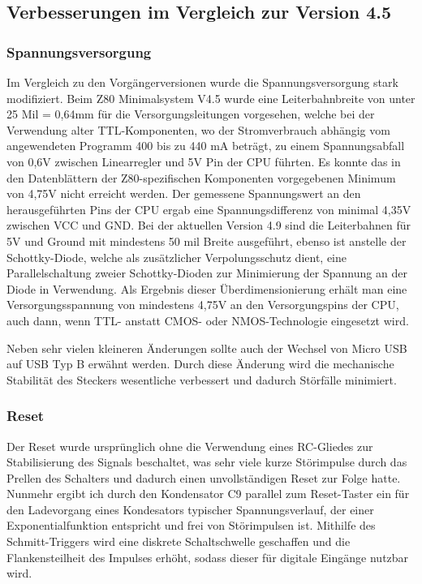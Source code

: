 \subsection{Verbesserungen im Vergleich zur Version 4.5}
\subsubsection{Spannungsversorgung}
Im Vergleich zu den Vorgängerversionen wurde die Spannungsversorgung stark modifiziert. Beim Z80 Minimalsystem V4.5 wurde eine Leiterbahnbreite von unter 25 Mil = 0,64mm für die Versorgungsleitungen vorgesehen, welche bei der Verwendung alter TTL-Komponenten, wo der Stromverbrauch abhängig vom angewendeten Programm 400 bis zu 440 mA beträgt, zu einem Spannungsabfall von 0,6V zwischen Linearregler und 5V Pin der CPU führten. Es konnte das in den Datenblättern der Z80-spezifischen Komponenten vorgegebenen Minimum von 4,75V nicht erreicht werden. Der gemessene Spannungswert an den herausgeführten Pins der CPU ergab eine Spannungsdifferenz von minimal 4,35V zwischen VCC und GND. Bei der aktuellen Version 4.9 sind die Leiterbahnen für 5V und Ground mit mindestens 50 mil Breite ausgeführt, ebenso ist anstelle der Schottky-Diode, welche als zusätzlicher Verpolungsschutz dient, eine Parallelschaltung zweier Schottky-Dioden zur Minimierung der Spannung an der Diode in Verwendung. Als Ergebnis dieser Überdimensionierung erhält man eine Versorgungsspannung von mindestens 4,75V an den Versorgungspins der CPU, auch dann, wenn TTL- anstatt CMOS- oder NMOS-Technologie eingesetzt wird.

Neben sehr vielen kleineren Änderungen sollte auch der Wechsel von Micro USB auf USB Typ B erwähnt werden. Durch diese Änderung wird die mechanische Stabilität des Steckers wesentliche verbessert und dadurch Störfälle minimiert. 

\subsubsection{Reset}
Der Reset wurde ursprünglich ohne die Verwendung eines RC-Gliedes zur Stabilisierung des Signals beschaltet, was sehr viele kurze Störimpulse durch das Prellen des Schalters und dadurch einen unvollständigen Reset zur Folge hatte. Nunmehr ergibt ich durch den Kondensator C9 parallel zum Reset-Taster ein für den Ladevorgang eines Kondesators typischer Spannungsverlauf, der einer Exponentialfunktion entspricht und frei von Störimpulsen ist. Mithilfe des Schmitt-Triggers wird eine diskrete Schaltschwelle geschaffen und die Flankensteilheit des Impulses erhöht, sodass dieser für digitale Eingänge nutzbar wird.

